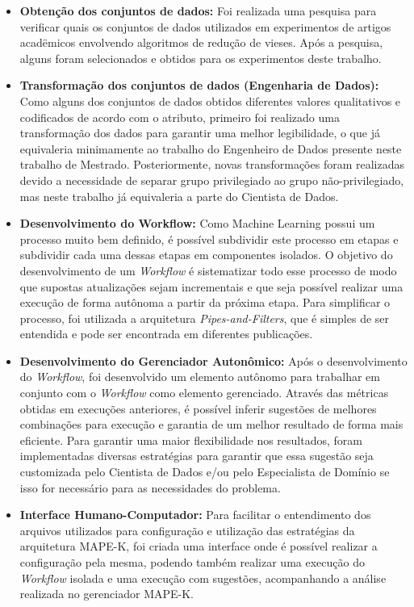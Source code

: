 \documentclass[portugues]{ic-tese}
\begin{document}
\begin{itemize}
\item \textbf{Obtenção dos conjuntos de dados:} Foi realizada uma pesquisa para verificar quais os conjuntos de dados utilizados em experimentos de artigos acadëmicos envolvendo algoritmos de redução de vieses. Após a pesquisa, alguns foram selecionados e obtidos para os experimentos deste trabalho.

\item \textbf{Transformação dos conjuntos de dados (Engenharia de Dados):} Como alguns dos conjuntos de dados obtidos diferentes valores qualitativos e codificados de acordo com o atributo, primeiro foi realizado uma transformação dos dados para garantir uma melhor legibilidade, o que já equivaleria minimamente ao trabalho do Engenheiro de Dados presente neste trabalho de Mestrado. Posteriormente, novas transformações foram realizadas devido a necessidade de separar grupo privilegiado ao grupo não-privilegiado, mas neste trabalho já equivaleria a parte do Cientista de Dados.

\item \textbf{Desenvolvimento do Workflow:} Como Machine Learning possui um processo muito bem definido, é possível subdividir este processo em etapas e subdividir cada uma dessas etapas em componentes isolados. O objetivo do desenvolvimento de um \textit{Workflow} é sistematizar todo esse processo de modo que supostas atualizações sejam incrementais e que seja possível realizar uma execução de forma autônoma a partir da próxima etapa. Para simplificar o processo, foi utilizada a arquitetura \textit{Pipes-and-Filters}, que é simples de ser entendida e pode ser encontrada em diferentes publicações.

\item \textbf{Desenvolvimento do Gerenciador Autonômico:} Após o desenvolvimento do \textit{Workflow}, foi desenvolvido um elemento autônomo para trabalhar em conjunto com o \textit{Workflow} como elemento gerenciado. Através das métricas obtidas em execuções anteriores, é possível inferir sugestões de melhores combinações para execução e garantia de um melhor resultado de forma mais eficiente. Para garantir uma maior flexibilidade nos resultados, foram implementadas diversas estratégias para garantir que essa sugestão seja customizada pelo Cientista de Dados e/ou pelo Especialista de Domínio se isso for necessário para as necessidades do problema.

\item \textbf{Interface Humano-Computador:} Para facilitar o entendimento dos arquivos utilizados para configuração e utilização das estratégias da arquitetura MAPE-K, foi criada uma interface onde é possível realizar a configuração pela mesma, podendo também realizar uma execução do \textit{Workflow} isolada e uma execução com sugestões, acompanhando a análise realizada no gerenciador MAPE-K.

\end{itemize}
\end{document}
